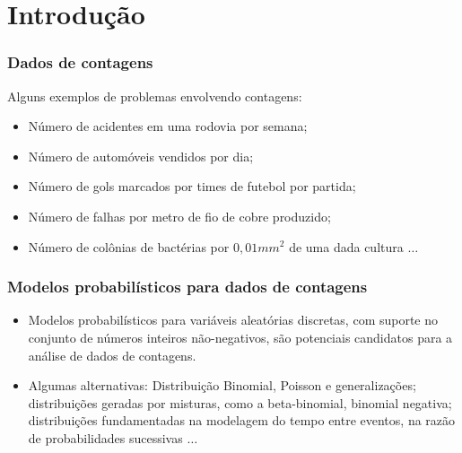 

\section{Introdução}
\label{intro}

\begin{frame}
\frametitle{Dados de contagens}
Alguns exemplos de problemas envolvendo contagens:

\vspace{0,2cm}
\begin{itemize}
\item Número de acidentes em uma rodovia por semana;
\item Número de automóveis vendidos por dia;
\item Número de gols marcados por times de futebol por partida;
\item Número de falhas por metro de fio de cobre produzido;
\item Número de colônias de bactérias por $0,01mm^{2}$ de uma dada 
cultura $\ldots$

\end{itemize}
\end{frame}

\begin{frame}
\frametitle{Modelos probabilísticos para dados de contagens}

\begin{itemize}
    \item Modelos probabilísticos para variáveis aleatórias discretas, 
    com suporte no conjunto de números inteiros não-negativos, 
    são potenciais candidatos para a análise de dados de contagens.
\vspace{0.5cm}
    \item Algumas alternativas: Distribuição Binomial, Poisson e 
    generalizações; distribuições geradas por misturas, como a 
    beta-binomial, binomial negativa; distribuições fundamentadas na 
    modelagem do tempo entre eventos, na razão de probabilidades 
    sucessivas $\ldots$

\end{itemize}
\end{frame}

